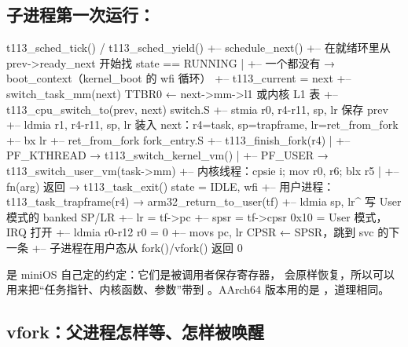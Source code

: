 \subsection{子进程第一次运行：}

\begin{txtcode}
t113_sched_tick() / t113_sched_yield()
+-- schedule_next()
    +-- 在就绪环里从 prev->ready_next 开始找 state == RUNNING
    |   +-- 一个都没有 → boot_context（kernel_boot 的 wfi 循环）
    +-- t113_current = next
    +-- switch_task_mm(next)            TTBR0 ← next->mm->l1 或内核 L1 表
    +-- t113_cpu_switch_to(prev, next)  switch.S
        +-- stmia r0, {r4-r11, sp, lr}  保存 prev
        +-- ldmia r1, {r4-r11, sp, lr}  装入 next：r4=task, sp=trapframe, lr=ret_from_fork
        +-- bx lr
            +-- ret_from_fork           fork_entry.S
                +-- t113_finish_fork(r4)
                |   +-- PF_KTHREAD → t113_switch_kernel_vm()
                |   +-- PF_USER    → t113_switch_user_vm(task->mm)
                +-- 内核线程：cpsie i; mov r0, r6; blx r5
                |   +-- fn(arg) 返回 → t113_task_exit()   state = IDLE, wfi
                +-- 用户进程：t113_task_trapframe(r4) → arm32_return_to_user(tf)
                    +-- ldmia {sp, lr}^        写 User 模式的 banked SP/LR
                    +-- lr  = tf->pc
                    +-- spsr = tf->cpsr        0x10 = User 模式，IRQ 打开
                    +-- ldmia r0-r12           r0 = 0
                    +-- movs pc, lr            CPSR ← SPSR，跳到 svc 的下一条
                        +-- 子进程在用户态从 fork()/vfork() 返回 0
\end{txtcode}

 是 miniOS 自己定的约定：它们是被调用者保存寄存器， 会原样恢复，所以可以用来把“任务指针、内核函数、参数”带到 。AArch64 版本用的是 ，道理相同。

\subsection{vfork：父进程怎样等、怎样被唤醒}

